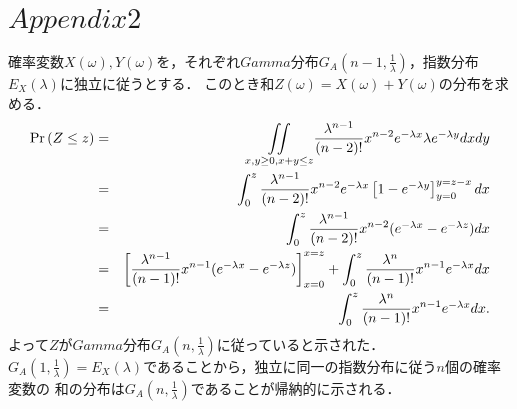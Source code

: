 \documentclass[a4j,papersize,disablejfam,slide,14pt]{jsarticle}
\def\exp#1{\mbox{$ e^{#1} $}} %
\def\prob#1{\mbox{${\rm Pr} \left( #1 \right)$}} %
\begin{document}
\section{$Appendix2$}
	確率変数$X(\omega),Y(\omega)$を，それぞれ$Gamma$分布$G_A(n-1, \frac{1}{\lambda})$，指数分布$E_X(\lambda)$に独立に従うとする．
    このとき和$Z(\omega) = X(\omega) + Y(\omega)$の分布を求める．
    \begin{eqnarray}
    	\prob{Z \leq z} &=& \underset{x,y \geq 0, x + y \leq z}{\iint} \frac{\lambda^{n-1}}{(n-2)!}x^{n-2}\exp{-\lambda x} \lambda \exp{-\lambda y} dxdy \\
        &=& \int_{0}^{z} \frac{\lambda^{n-1}}{(n-2)!}x^{n-2}\exp{-\lambda x} \left[ 1 - \exp{-\lambda y} \right]_{y=0}^{y = z - x} dx \\
        &=& \int_{0}^{z} \frac{\lambda^{n-1}}{(n-2)!}x^{n-2}(\exp{-\lambda x} - \exp{-\lambda z}) dx \\
        &=& \left[ \frac{\lambda^{n-1}}{(n-1)!}x^{n-1}(\exp{-\lambda x} - \exp{-\lambda z}) \right]_{x=0}^{x=z} + \int_{0}^{z} \frac{\lambda^n}{(n-1)!}x^{n-1}\exp{-\lambda x} dx \\
        &=& \int_{0}^{z} \frac{\lambda^n}{(n-1)!}x^{n-1}\exp{-\lambda x} dx.
    \end{eqnarray}
    よって$Z$が$Gamma$分布$G_A(n, \frac{1}{\lambda})$に従っていると示された．$G_A(1, \frac{1}{\lambda}) = E_X(\lambda)$であることから，独立に同一の指数分布に従う$n$個の確率変数の
    和の分布は$G_A(n, \frac{1}{\lambda})$であることが帰納的に示される．
\end{document}
